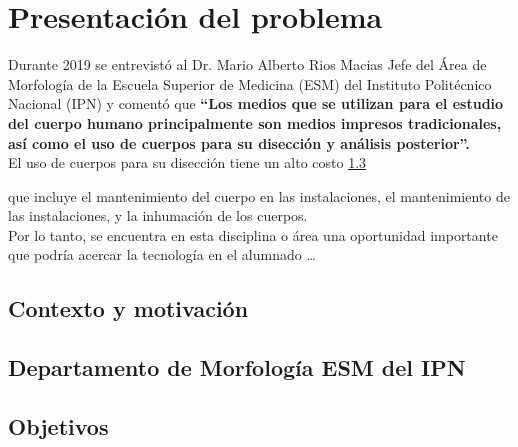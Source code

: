 \chapter{Presentación del problema}
Durante 2019 se entrevistó al Dr. Mario Alberto Rios Macias Jefe del Área de Morfología de la Escuela Superior de Medicina (ESM) 
del Instituto Politécnico Nacional (IPN) y comentó que \textbf{“Los medios que se utilizan para el estudio del cuerpo humano principalmente 
son medios impresos tradicionales, así como el uso de cuerpos para su disección y análisis posterior”.}\\
El uso de cuerpos para su disección tiene un alto costo \ref{} 
 que incluye el mantenimiento del cuerpo en las instalaciones, el mantenimiento de las instalaciones, y la inhumación de los cuerpos.\\
Por lo tanto, se encuentra en esta disciplina o área una oportunidad importante que podría acercar la tecnología en el alumnado … 

\section{Contexto y motivación}

\section{Departamento de Morfología ESM del IPN}

\section{Objetivos}

